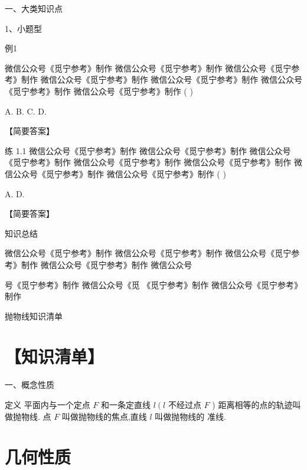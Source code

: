 \documentclass[10pt]{article}
\begin{document}
一、大类知识点

1、小题型

例1           

微信公众号《觅宁参考》制作 微信公众号《觅宁参考》制作 微信公众号《觅宁参考》制作 微信公众号《觅宁参考》制作 微信公众号《觅宁参考》制作 微信公众号 《觅宁参考》制作 微信公众号《觅宁参考》制作 ( )

A. B. C. D.

【简要答案】

练 1.1 微信公众号《觅宁参考》制作 微信公众号《觅宁参考》制作 微信公众号《觅宁参考》制作 微信公众号《觅宁参考》制作 微信公众号《觅宁参考》制作 微信公众号《觅宁参考》制作 微信公众号《觅宁参考》制作 ( )

A. D.

【简要答案】

知识总结

微信公众号《觅宁参考》制作 微信公众号《觅宁参考》制作 微信公众号《觅宁参考》制作 微信公众号《觅宁参考》制作 微信公众号

号《觅宁参考》制作 微信公众号《觅 《觅宁参考》制作 微信公众号《觅宁参考》制作

抛物线知识清单

\section*{【知识清单】}

一、概念性质

定义 平面内与一个定点 \(F\) 和一条定直线 \(l\left( l\right.\) 不经过点 \(F\) ) 距离相等的点的轨迹叫做抛物线. 点 \(F\) 叫做抛物线的焦点,直线 \(l\) 叫做抛物线的 准线.

\section*{几何性质}
\end{document}
